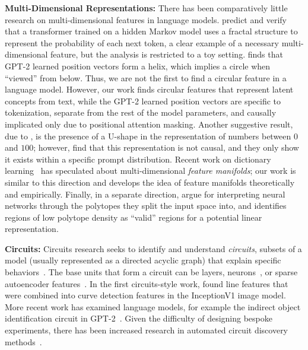 \documentclass{article} %
\DeclareRobustCommand{\revOne}[1]{#1}
\theoremstyle{plain}
\theoremstyle{definition}
\begin{document}
    \textbf{Multi-Dimensional Representations:} 
    There has been comparatively little research on multi-dimensional features in language models. \revOne{\cite{belief_state_geoemtry} predict and verify that a
transformer trained on a hidden Markov model uses a fractal structure to represent the probability
of each next token, a clear example of a necessary multi-dimensional feature, but the analysis is restricted to a toy setting.} \cite{yedidate2023helix1, yedidate2023helix2} finds that GPT-2 learned position vectors form a helix, which implies a circle when “viewed” from below. Thus, we are not the first to find a circular feature in a language model. However, our work finds circular features that represent latent concepts from text, while the GPT-2 learned position vectors are specific to tokenization, separate from the rest of the model parameters, and causally implicated only due to positional attention masking. Another suggestive result, due to \cite{gpt2_greater_than}, is the presence of a U-shape in the representation of numbers between $0$ and $100$; however, \cite{gpt2_greater_than} find that this representation is not causal, and they only show it exists within a specific prompt distribution. Recent work on dictionary learning~\citep{dictionary_monosemanticity_anthropic} has speculated about multi-dimensional \textit{feature manifolds}; our work is similar to this direction and develops the idea of feature manifolds theoretically and empirically. Finally, in a separate direction, \cite{polytope_lens} argue for interpreting neural networks through the polytopes they split the input space into, and identifies regions of low polytope density as ``valid'' regions for a potential linear representation. 

    \textbf{Circuits:} Circuits research seeks to identify and understand \textit{circuits}, subsets of a model (usually represented as a directed acyclic graph) that explain specific behaviors~\citep{olah2020zoom}. The base units that form a circuit can be layers, neurons~\citep{olah2020zoom}, or sparse autoencoder features~\citep{marks2024sparse}. In the first circuits-style work, \cite{olah2020zoom} found line features that were combined into curve detection features in the InceptionV1 image model. More recent work has examined language models, for example the indirect object identification circuit in GPT-2~\citep{gpt2_ioi}. Given the difficulty of designing bespoke experiments, there has been increased research in automated circuit discovery methods~\citep{marks2024sparse, acdc_circuits, syed2023attribution}.
\end{document}
